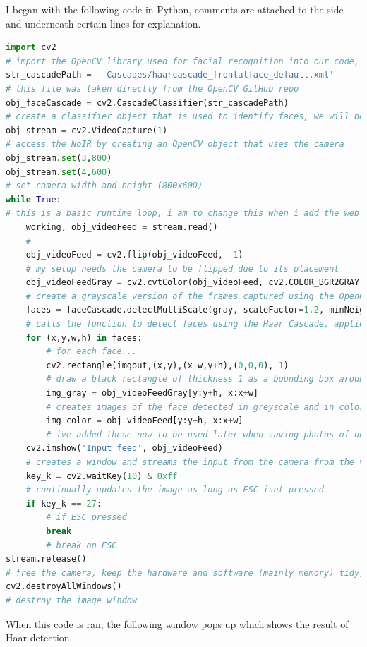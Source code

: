 \documentclass[9pt]{article}
\begin{document}
I began with the following code in Python, comments are attached to the side and underneath certain lines for explanation.
\begin{lstlisting}[language=Python]
import cv2 
# import the OpenCV library used for facial recognition into our code, we can then call all functions in this library
str_cascadePath =  'Cascades/haarcascade_frontalface_default.xml'
# this file was taken directly from the OpenCV GitHub repo
obj_faceCascade = cv2.CascadeClassifier(str_cascadePath) 
# create a classifier object that is used to identify faces, we will be using the cascade that str_cascadePath points to
obj_stream = cv2.VideoCapture(1) 
# access the NoIR by creating an OpenCV object that uses the camera
obj_stream.set(3,800) 
obj_stream.set(4,600)
# set camera width and height (800x600)
while True: 
# this is a basic runtime loop, i am to change this when i add the web interface to call this as a function
	working, obj_videoFeed = stream.read() 
	# 
	obj_videoFeed = cv2.flip(obj_videoFeed, -1) 
	# my setup needs the camera to be flipped due to its placement
	obj_videoFeedGray = cv2.cvtColor(obj_videoFeed, cv2.COLOR_BGR2GRAY) 
	# create a grayscale version of the frames captured using the OpenCV conversion
	faces = faceCascade.detectMultiScale(gray, scaleFactor=1.2, minNeighbors=5, minSize=(30, 30)) 
	# calls the function to detect faces using the Haar Cascade, applied to the gray image
	for (x,y,w,h) in faces: 
		# for each face...
		cv2.rectangle(imgout,(x,y),(x+w,y+h),(0,0,0), 1) 
		# draw a black rectangle of thickness 1 as a bounding box around the face
		img_gray = obj_videoFeedGray[y:y+h, x:x+w] 
		# creates images of the face detected in greyscale and in color
		img_color = obj_videoFeed[y:y+h, x:x+w] 
		# ive added these now to be used later when saving photos of unknown people, just for testing at the moment
	cv2.imshow('Input feed', obj_videoFeed) 
	# creates a window and streams the input from the camera from the variable imgout
	key_k = cv2.waitKey(10) & 0xff 
	# continually updates the image as long as ESC isnt pressed
	if key_k == 27:
		# if ESC pressed
		break 
		# break on ESC
stream.release() 
# free the camera, keep the hardware and software (mainly memory) tidy, this prevents errors with the camera being in-use whilst we try to run the code
cv2.destroyAllWindows() 
# destroy the image window
\end{lstlisting}
When this code is ran, the following window pops up which shows the result of Haar detection.
\end{document}
